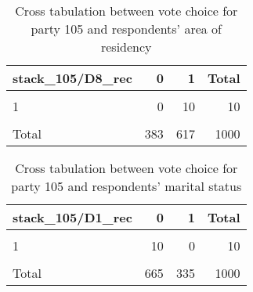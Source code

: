 \documentclass[
]{article}
\begin{document}
\begin{table}

\caption{\label{tab:unnamed-chunk-7}Cross tabulation between vote choice for party 105 and respondents' area of residency 
                   \label{table:crosstab_1_at}}
\centering
\begin{tabular}[t]{l|r|r|r}
\hline
stack\_105/D8\_rec & 0 & 1 & Total\\
\hline
\cellcolor{gray!6}{0} & \cellcolor{gray!6}{370} & \cellcolor{gray!6}{595} & \cellcolor{gray!6}{965}\\
\hline
1 & 0 & 10 & 10\\
\hline
\cellcolor{gray!6}{NA} & \cellcolor{gray!6}{13} & \cellcolor{gray!6}{12} & \cellcolor{gray!6}{25}\\
\hline
Total & 383 & 617 & 1000\\
\hline
\end{tabular}
\end{table}

\begin{table}

\caption{\label{tab:unnamed-chunk-7}Cross tabulation between vote choice for party 105 and respondents' marital status
                   \label{table:crosstab_2_at}}
\centering
\begin{tabular}[t]{l|r|r|r}
\hline
stack\_105/D1\_rec & 0 & 1 & Total\\
\hline
\cellcolor{gray!6}{0} & \cellcolor{gray!6}{636} & \cellcolor{gray!6}{329} & \cellcolor{gray!6}{965}\\
\hline
1 & 10 & 0 & 10\\
\hline
\cellcolor{gray!6}{NA} & \cellcolor{gray!6}{19} & \cellcolor{gray!6}{6} & \cellcolor{gray!6}{25}\\
\hline
Total & 665 & 335 & 1000\\
\hline
\end{tabular}
\end{table}
\end{document}
